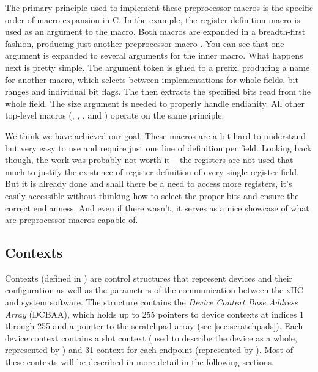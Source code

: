 The primary principle used to implement these preprocessor macros is the
specific order of macro expansion in C. In the example, the register definition
macro is used as an argument to the  macro. Both macros are
expanded in a breadth-first fashion, producing just another preprocessor macro
. You can see
that one argument is expanded to several arguments for the inner macro. What
happens next is pretty simple. The  argument token is glued to
a prefix, producing a name for another macro, which selects between
implementations for whole fields, bit ranges and individual bit flags. The
 then extracts the specified bits read from the whole
field. The size argument is needed to properly handle endianity. All other
top-level macros (, ,
,  and ) operate
on the same principle.

We think we have achieved our goal. These macros are a bit hard to understand but
very easy to use and require just one line of definition per field. Looking
back though, the work was probably not worth it -- the registers are not used
that much to justify the existence of register definition of every single register
field. But it is already done and shall there be a need to access more registers,
it's easily accessible without thinking how to select the proper bits and
ensure the correct endianness. And even if there wasn't, it serves as a nice
showcase of what are preprocessor macros capable of.

\subsection{Contexts}

Contexts (defined in )
are control structures that represent devices and their configuration as well
as the parameters of the communication between the xHC and system software. The
 structure contains the \textit{Device Context Base Address Array} (DCBAA), which
holds up to 255 pointers to device contexts at indices 1 through 255 and a pointer to
the scratchpad array (see \ref{sec:scratchpads}). Each device context contains a slot
context (used to describe the device as a whole, represented by ) and
31 context for each endpoint (represented by ). Most of these contexts
will be described in more detail in the following sections.

